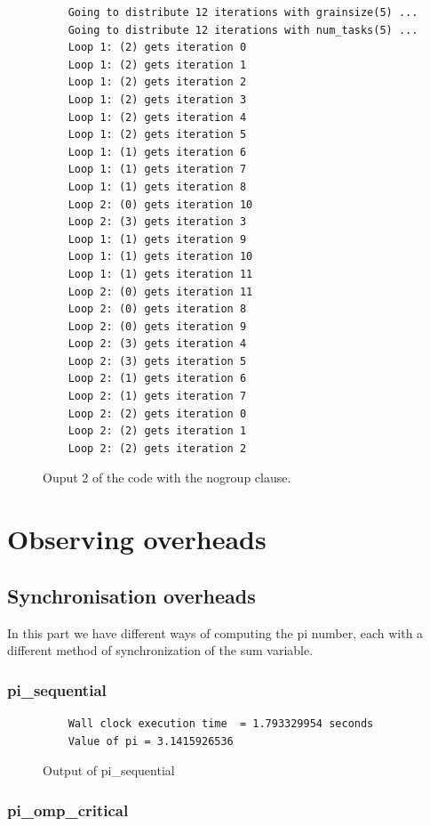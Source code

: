 \documentclass[12pt, a4paper]{article}
\begin{document}
\begin{figure}[H]
	\begin{lstlisting}
	Going to distribute 12 iterations with grainsize(5) ...
	Going to distribute 12 iterations with num_tasks(5) ...
	Loop 1: (2) gets iteration 0
	Loop 1: (2) gets iteration 1
	Loop 1: (2) gets iteration 2
	Loop 1: (2) gets iteration 3
	Loop 1: (2) gets iteration 4
	Loop 1: (2) gets iteration 5
	Loop 1: (1) gets iteration 6
	Loop 1: (1) gets iteration 7
	Loop 1: (1) gets iteration 8
	Loop 2: (0) gets iteration 10
	Loop 2: (3) gets iteration 3
	Loop 1: (1) gets iteration 9
	Loop 1: (1) gets iteration 10
	Loop 1: (1) gets iteration 11
	Loop 2: (0) gets iteration 11
	Loop 2: (0) gets iteration 8
	Loop 2: (0) gets iteration 9
	Loop 2: (3) gets iteration 4
	Loop 2: (3) gets iteration 5
	Loop 2: (1) gets iteration 6
	Loop 2: (1) gets iteration 7
	Loop 2: (2) gets iteration 0
	Loop 2: (2) gets iteration 1
	Loop 2: (2) gets iteration 2
	\end{lstlisting}
	
	\caption{Ouput 2 of the code with the nogroup clause.}
	\label{Ouput 2 of the code with the nogroup clause.}
\end{figure}

\section{Observing overheads}

\subsection{Synchronisation overheads}

In this part we have different ways of computing the pi number, each with a different method of synchronization of the sum variable.

\subsubsection{pi\_sequential}

\begin{figure}[H]
	\begin{lstlisting}
	Wall clock execution time  = 1.793329954 seconds
	Value of pi = 3.1415926536		
	\end{lstlisting}
	\caption{Output of pi\_sequential}
\end{figure}

\subsubsection{pi\_omp\_critical}
\end{document}
